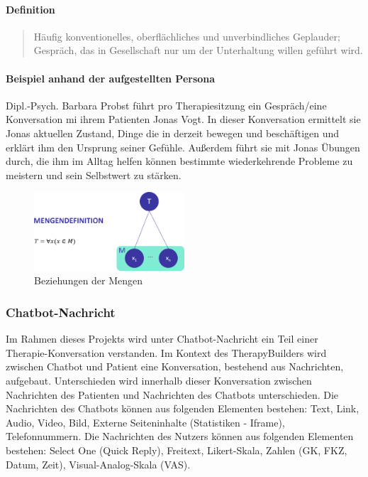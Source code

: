 \paragraph{Definition}
\begin{quote}
Häufig konventionelles, oberflächliches und unverbindliches Geplauder; Gespräch, das in Gesellschaft nur um der Unterhaltung willen geführt wird. \cite{DudenKon2:online}
\end{quote}

\paragraph{Beispiel anhand der aufgestellten Persona}
Dipl.-Psych. Barbara Probst führt pro Therapiesitzung ein Gespräch/eine Konversation mi ihrem Patienten Jonas Vogt. In dieser Konversation ermittelt sie Jonas aktuellen Zustand, Dinge die in derzeit bewegen und beschäftigen und erklärt ihm den Ursprung seiner Gefühle. Außerdem führt sie mit Jonas Übungen durch, die ihm im Alltag helfen können bestimmte wiederkehrende Probleme zu meistern und sein Selbstwert zu stärken.

\begin{figure}[h]
\centering
\includegraphics[width=0.5\textwidth]{pictures/therapiedef}
\caption{Beziehungen der Mengen}
\label{therapiedef}
\end{figure}


\subsubsection{Chatbot-Nachricht}
Im Rahmen dieses Projekts wird unter Chatbot-Nachricht ein Teil einer Therapie-Konversation verstanden. Im Kontext des TherapyBuilders wird zwischen Chatbot und Patient eine Konversation, bestehend aus Nachrichten, aufgebaut. Unterschieden wird innerhalb dieser Konversation zwischen Nachrichten des Patienten und Nachrichten des Chatbots unterschieden. Die Nachrichten des Chatbots können aus folgenden Elementen bestehen: Text, Link, Audio, Video, Bild, Externe Seiteninhalte (Statistiken - Iframe), Telefonnummern. Die Nachrichten des Nutzers können aus folgenden Elementen bestehen: Select One (Quick Reply), Freitext, Likert-Skala, Zahlen (GK, FKZ, Datum, Zeit), Visual-Analog-Skala (VAS).

